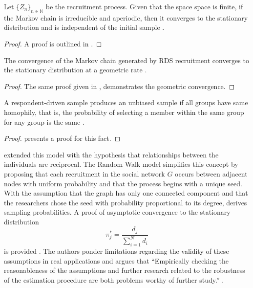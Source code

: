 \begin{theorem} 
    Let $\{Z_n\}_{n \in \mathbb{N}}$ be the recruitment process. Given that
    the space space is finite, if the Markov chain is irreducible and
    aperiodic, then it converges to the stationary distribution and is
    independent of the initial sample \cite[p. 183]{heckathorn1997}. 
\end{theorem}

\begin{proof}
   A proof is outlined in \cite[p. 52-53]{levin2017markov}. 
\end{proof}

\begin{theorem}
    The convergence of the Markov chain generated by RDS recruitment converges
    to the stationary distribution at a geometric rate \cite[p. 186]{heckathorn1997}.
\end{theorem}

\begin{proof}
    The same proof given in \cite[p. 52-53]{levin2017markov}, demonstrates the
    geometric convergence.
\end{proof}

\begin{theorem}
  A respondent-driven sample produces an unbiased sample if all groups have
  same homophily, that is, the probability of selecting a member within the
  same group for any group is the same \cite[p. 192]{heckathorn1997}.
\end{theorem}

\begin{proof}
  \textcite[p. 191 - 192]{heckathorn1997} presents a proof for this fact. 
\end{proof}

\textcite[p.22]{heckathorn2002} extended this model with the hypothesis that relationships between
the individuals are reciprocal. The Random Walk model simplifies this concept
by proposing that each recruitment in the social network $G$ occurs between
adjacent nodes with uniform probability and that the process begins with a
unique seed. With the assumption that the graph has only one connected
component and that the researchers chose the seed with probability
proportional to its degree, \textcite[p. 209-218]{salganik2004sampling}
derives sampling probabilities. A proof of asymptotic convergence to the stationary
distribution 
\begin{equation}
  \pi_j^{*} = \frac{d_j}{\sum_{i=1}^N d_i}
\end{equation}
is provided \cite[p. 234-235]{salganik2004sampling}. The authors ponder
limitations regarding the validity of these assumptions in real applications
and argues that ``Empirically checking the reasonableness of the assumptions and further 
research related to the robustness of the estimation procedure are
both problems worthy of further study.'' \cite[p. 230]{salganik2004sampling}.

